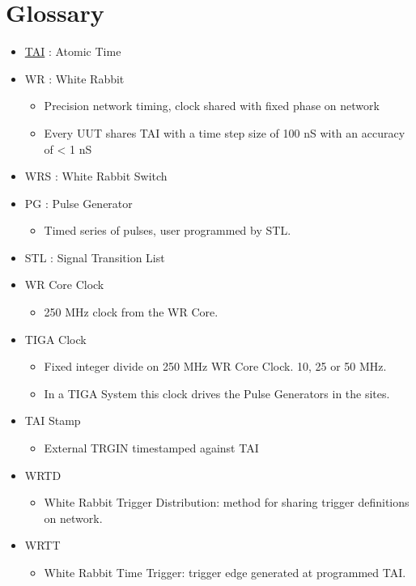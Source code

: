 \documentclass[]{article}
\begin{document}
\section{Glossary}
\begin{itemize}
	\setlength\itemsep{0pt}
	\item \href{https://www.timeanddate.com/time/international-atomic-time.html}{TAI} : Atomic Time
	\item WR : White Rabbit
	\begin{itemize}
		\item Precision network timing, clock shared with fixed phase on network
		\item Every UUT shares TAI with a time step size of 100 nS with an accuracy of < 1 nS
	\end{itemize}
	\item WRS : White Rabbit Switch
	\item PG : Pulse Generator
	\begin{itemize}
		\item Timed series of pulses, user programmed by STL.
	\end{itemize}
	\item STL : Signal Transition List
	\item WR Core Clock
	\begin{itemize}
		\item 250 MHz clock from the WR Core.
	\end{itemize}
	\item TIGA Clock
	\begin{itemize}
		\item Fixed integer divide on 250 MHz WR Core Clock. 10, 25 or 50 MHz.
		\item In a TIGA System this clock drives the Pulse Generators in the sites.
	\end{itemize}
	\item TAI Stamp
	\begin{itemize}
		\item External TRGIN timestamped against TAI 
	\end{itemize}
	\item WRTD
	\begin{itemize}
		\item White Rabbit Trigger Distribution: method for sharing trigger definitions on network.
	\end{itemize}
	\item WRTT
	\begin{itemize}
		\item White Rabbit Time Trigger: trigger edge generated at programmed TAI.

\end{itemize}
\end{itemize}
\end{document}
